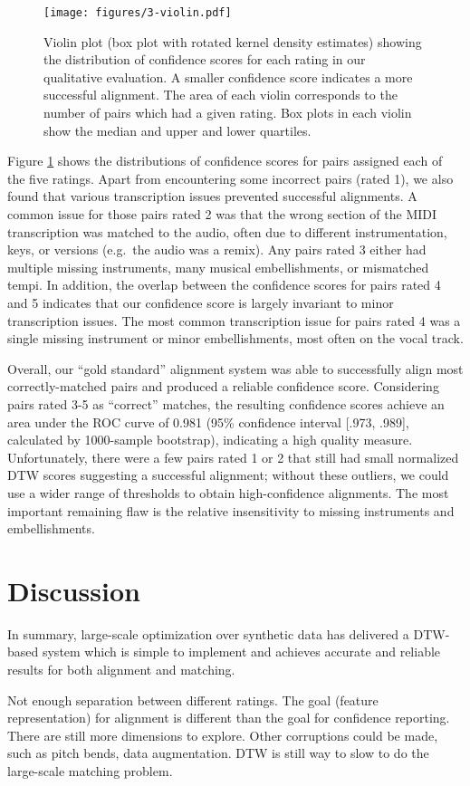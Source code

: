 \begin{figure}[t]
  \centering
  \texttt{[image: figures/3-violin.pdf]}
  \caption[Distributions of confidence scores for each rating]{Violin plot (box plot with rotated kernel density estimates) showing the distribution of confidence scores for each rating in our qualitative evaluation.
A smaller confidence score indicates a more successful alignment.
The area of each violin corresponds to the number of pairs which had a given rating.
Box plots in each violin show the median and upper and lower quartiles.}
  \label{fig:violin}
\end{figure}

Figure \ref{fig:violin} shows the distributions of confidence scores for pairs assigned each of the five ratings.
Apart from encountering some incorrect pairs (rated 1), we also found that various transcription issues prevented successful alignments.
A common issue for those pairs rated 2 was that the wrong section of the MIDI transcription was  matched to the audio, often due to different instrumentation, keys, or versions (e.g.\ the audio was a remix).
Any pairs rated 3 either had multiple missing instruments, many musical embellishments, or mismatched tempi.
In addition, the overlap between the confidence scores for pairs rated 4 and 5 indicates that our confidence score is largely invariant to minor transcription issues.
The most common transcription issue for pairs rated 4 was a single missing instrument or minor embellishments, most often on the vocal track.

Overall, our ``gold standard'' alignment system was able to successfully align most correctly-matched pairs and produced a reliable confidence score.
Considering pairs rated 3-5 as ``correct'' matches, the resulting confidence scores achieve an area under the ROC curve of 0.981 (95\% confidence interval [.973, .989], calculated by 1000-sample bootstrap), indicating a high quality measure.
Unfortunately, there were a few pairs rated 1 or 2 that still had small normalized DTW scores suggesting a successful alignment; without these outliers, we could use a wider range of thresholds to obtain high-confidence alignments.
The most important remaining flaw is the relative insensitivity to missing instruments and embellishments.

\section{Discussion}
\label{sec:discussion}

In summary, large-scale optimization over synthetic data has delivered a DTW-based system which is simple to implement and achieves accurate and reliable results for both alignment and matching.

Not enough separation between different ratings.
The goal (feature representation) for alignment is different than the goal for confidence reporting.
There are still more dimensions to explore.
Other corruptions could be made, such as pitch bends, data augmentation.
DTW is still way to slow to do the large-scale matching problem.

